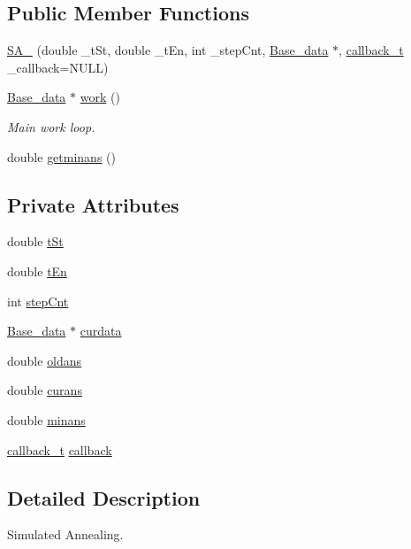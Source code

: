 \subsection*{Public Member Functions}
\begin{DoxyCompactItemize}
\item 
\hyperlink{classSA__2_a14d69737deeebd1d413517bf013cd16f}{S\+A\+\_} (double \+\_\+t\+St, double \+\_\+t\+En, int \+\_\+step\+Cnt, \hyperlink{classBase__data}{Base\+\_\+data} $\ast$, \hyperlink{classSA__2_a1c708dff32ff0526b5b5926e38e77dee}{callback\+\_\+t} \+\_\+callback=N\+U\+L\+L)
\item 
\hyperlink{classBase__data}{Base\+\_\+data} $\ast$ \hyperlink{classSA__2_a991bd4a7842fcaae442e0916445e45ae}{work} ()
\begin{DoxyCompactList}\small\item\em Main work loop. \end{DoxyCompactList}\item 
double \hyperlink{classSA__2_adbe6c7eb3f5c15b5ff72490de3be25c4}{getminans} ()
\end{DoxyCompactItemize}
\subsection*{Private Attributes}
\begin{DoxyCompactItemize}
\item 
double \hyperlink{classSA__2_a826b4a07815b519edd1821b07a0ed1f6}{t\+St}
\item 
double \hyperlink{classSA__2_a11eb83d386c783b62689b95a1d61f81b}{t\+En}
\item 
int \hyperlink{classSA__2_a9e6e985f337007134f5b82b18fc2a809}{step\+Cnt}
\item 
\hyperlink{classBase__data}{Base\+\_\+data} $\ast$ \hyperlink{classSA__2_ac333f4a2da95b01b271ba7ae422b6744}{curdata}
\item 
double \hyperlink{classSA__2_aea8cf021e1378fd37136fdff5c11b111}{oldans}
\item 
double \hyperlink{classSA__2_a40815916496d990e8bb324c52b33cc2f}{curans}
\item 
double \hyperlink{classSA__2_a93a9b121b39a9a88eac0ebdcc2d4c4e0}{minans}
\item 
\hyperlink{classSA__2_a1c708dff32ff0526b5b5926e38e77dee}{callback\+\_\+t} \hyperlink{classSA__2_a211a847edaaaf0e95f49b50d7355cc28}{callback}
\end{DoxyCompactItemize}


\subsection{Detailed Description}
Simulated Annealing. 

